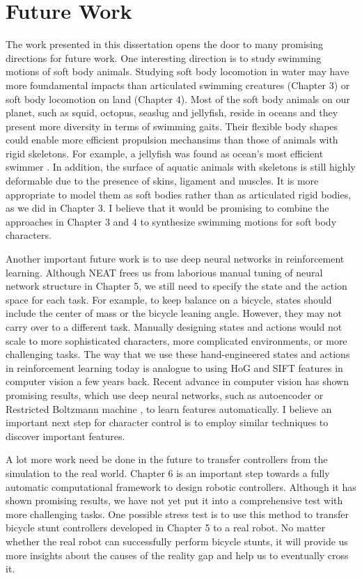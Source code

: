 \section{Future Work}

The work presented in this dissertation opens the door to many promising directions for future work. One interesting direction is to study swimming motions of soft body animals. Studying soft body locomotion in water may have more foundamental impacts than articulated swimming creatures (Chapter 3) or soft body locomotion on land (Chapter 4). Most of the soft body animals on our planet, such as squid, octopus, seaslug and jellyfish, reside in oceans and they present more diversity in terms of swimming gaits. Their flexible body shapes could enable more efficient propulsion mechansims than those of animals with rigid skeletons. For example, a jellyfish was found as ocean's most efficient swimmer \cite{Gemmell:2013}. In addition, the surface of aquatic animals with skeletons is still highly deformable due to the presence of skins, ligament and muscles. It is more appropriate to model them as soft bodies rather than as articulated rigid bodies, as we did in Chapter 3. I believe that it would be promising to combine the approaches in Chapter 3 and 4 to synthesize swimming motions for soft body characters.

Another important future work is to use deep neural networks in reinforcement learning. Although NEAT frees us from laborious manual tuning of neural network structure in Chapter 5, we still need to specify the state and the action space for each task. For example, to keep balance on a bicycle, states should include the center of mass or the bicycle leaning angle. However, they may not carry over to a different task. Manually designing states and actions would not scale to more sophisticated characters, more complicated environments, or more challenging tasks. The way that we use these hand-engineered states and actions in reinforcement learning today is analogue to using HoG and SIFT features in computer vision a few years back. Recent advance in computer vision has shown promising results, which use deep neural networks, such as autoencoder \cite{Vincent:2008} or Restricted Boltzmann machine \cite{Hinton:2012}, to learn features automatically. I believe an important next step for character control is to employ similar techniques to discover important features.

A lot more work need be done in the future to transfer controllers from the simulation to the real world. Chapter 6 is an important step towards a fully automatic computational framework to design robotic controllers. Although it has shown promising results, we have not yet put it into a comprehensive test with more challenging tasks. One possible stress test is to use this method to transfer bicycle stunt controllers developed in Chapter 5 to a real robot. No matter whether the real robot can successfully perform bicycle stunts, it will provide us more insights about the causes of the reality gap and help us to eventually cross it.

